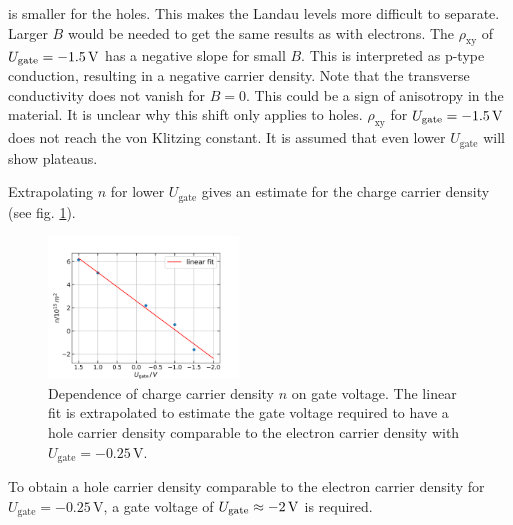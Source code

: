 is smaller for the holes.
This makes the Landau levels more difficult to separate. 
Larger $B$ would be needed to get the same results as with electrons.
The $\rho_\text{xy}$ of $U_\text{gate} = -1.5\,\text V$ has a negative slope for small $B$.
This is interpreted as p-type conduction, resulting in a negative carrier density.
Note that the transverse conductivity does not vanish for $B=0$.
This could be a sign of anisotropy in the material.
It is unclear why this shift only applies to holes.
$\rho_\text{xy}$ for $U_\text{gate} = -1.5 \,\text V$ does not reach the von Klitzing constant.
It is assumed that even lower $U_\text{gate}$ will show plateaus.

Extrapolating $n$ for lower $U_\text{gate}$ gives an estimate for the charge carrier density (see fig. \ref{fig:extrapolating}).
\begin{figure}[h]
    \centering
    \includegraphics[width=0.45\textwidth]{../Images/extrapolatingN.png}
    \caption{
        Dependence of charge carrier density $n$ on gate voltage.
        The linear fit is extrapolated to estimate the gate voltage required to have a hole carrier density comparable to the electron carrier density with $U_\text{gate} = -0.25\,\text{V}$.}
    \label{fig:extrapolating}
\end{figure}
To obtain a hole carrier density comparable to the electron carrier density for $U_\text{gate} = -0.25\,\text{V}$,
a gate voltage of $U_\text{gate} \approx -2\,\text V$ is required.
